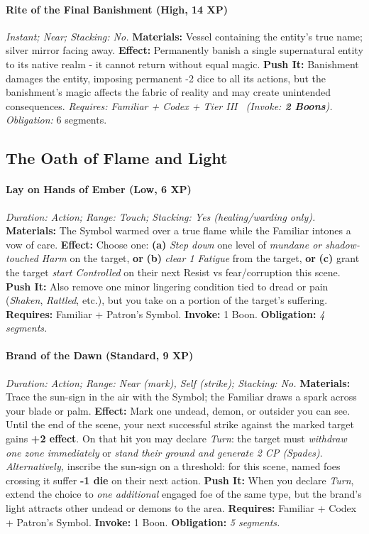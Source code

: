 \paragraph{Rite of the Final Banishment (High, 14 XP)} \emph{Instant; Near; Stacking: No.}
\textbf{Materials:} Vessel containing the entity's true name; silver mirror facing away.
\textbf{Effect:} Permanently banish a single supernatural entity to its native realm - it cannot return without equal magic.
\textbf{Push It:} Banishment damages the entity, imposing permanent -2 dice to all its actions, but the banishment's magic affects the fabric of reality and may create unintended consequences.
\emph{Requires: Familiar + Codex + Tier III \ (\textit{Invoke:} \textbf{2 Boons}).}
\emph{Obligation:} 6 segments.

\subsection*{The Oath of Flame and Light}
\paragraph{Lay on Hands of Ember (Low, 6 XP)} \emph{Duration: Action; Range: Touch; Stacking: Yes (healing/warding only).}  
\textbf{Materials:} The Symbol warmed over a true flame while the Familiar intones a vow of care.  
\textbf{Effect:} Choose one: \textbf{(a)} \emph{Step down} one level of \emph{mundane or shadow-touched Harm} on the target, \textbf{or} \textbf{(b)} \emph{clear 1 Fatigue} from the target, \textbf{or} \textbf{(c)} grant the target \emph{start Controlled} on their next Resist vs fear/corruption this scene.  
\textbf{Push It:} Also remove one minor lingering condition tied to dread or pain (\emph{Shaken}, \emph{Rattled}, etc.), but you take on a portion of the target's suffering.
\textbf{Requires:} Familiar + Patron's Symbol. \;\; \textbf{Invoke:} 1 Boon. \;\; \textbf{Obligation:} \emph{4 segments.}


\paragraph{Brand of the Dawn (Standard, 9 XP)} \emph{Duration: Action; Range: Near (mark), Self (strike); Stacking: No.}  
\textbf{Materials:} Trace the sun-sign in the air with the Symbol; the Familiar draws a spark across your blade or palm.  
\textbf{Effect:} Mark one undead, demon, or outsider you can see. Until the end of the scene, your next successful strike against the marked target gains \textbf{+2 effect}. On that hit you may declare \emph{Turn}: the target must \emph{withdraw one zone immediately} or \emph{stand their ground and generate 2 CP (Spades)}.  
\emph{Alternatively,} inscribe the sun-sign on a threshold: for this scene, named foes crossing it suffer \textbf{-1 die} on their next action.  
\textbf{Push It:} When you declare \emph{Turn}, extend the choice to \emph{one additional} engaged foe of the same type, but the brand's light attracts other undead or demons to the area.
\textbf{Requires:} Familiar + Codex + Patron's Symbol. \;\; \textbf{Invoke:} 1 Boon. \;\; \textbf{Obligation:} \emph{5 segments.}

